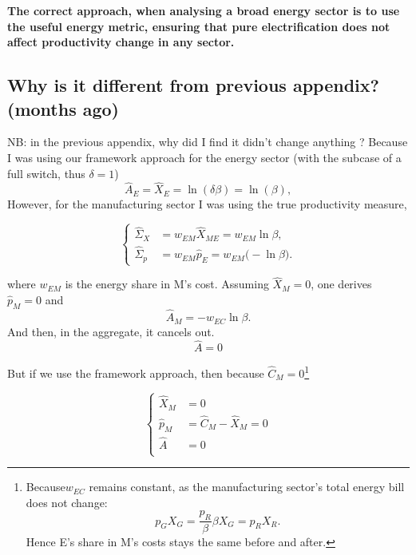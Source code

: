 \documentclass[11pt]{article}
\begin{document}
\textbf{The correct approach, when analysing a broad energy sector is to use the useful energy metric, ensuring that pure electrification does not affect productivity change in any sector.}



\subsection{Why is it different from previous appendix? (months ago)}

NB: in the previous appendix, why did I find it didn't change anything ? Because I was using our framework approach for the energy sector (with the subcase of a full switch, thus $\delta=1$) 
\[ \hat{A}_E=\hat{X}_E=\ln(\delta \beta )=\ln(\beta ),\]
However, for the manufacturing sector I was using the true productivity measure, 

  \begin{equation*}
    \left\{
    \begin{aligned}
        \hat{\Sigma}_X &= w_{EM}\hat{X}_{ME} 
                      = w_{EM}\ln \beta , \\
        \hat{\Sigma}_p &= w_{EM}\hat{p}_E
                      = w_{EM}\bigl(-\ln \beta \bigr).
    \end{aligned}
    \right.
\end{equation*}

where $w_{EM}$ is the energy share in M's cost.  Assuming $\hat{X}_M = 0$, one derives $\hat{p}_M = 0$ and
\begin{equation*}
    \hat{A}_M = -w_{EC}\ln \beta .
\end{equation*}
And then, in the aggregate, it cancels out. 
\[\hat{A}=0\]

But if we use the framework approach, then because $\hat{C}_M=0$\footnote{Because$w_{EC}$  remains constant, as the manufacturing sector's total energy bill does not change: 
\begin{equation*}
     p_GX_G 
         = \frac{p_R}{\beta }\beta X_G 
         = p_RX_R.
\end{equation*} Hence E's share in M's costs stays the same before and after.
}

\[
\left\{
\begin{aligned}
\hat{X}_M&=0\\
\hat{p}_M &= \hat{C}_M-\hat{X}_M= 0\\
\hat{A}&=0\\
\end{aligned}
\right.
\]
\end{document}
